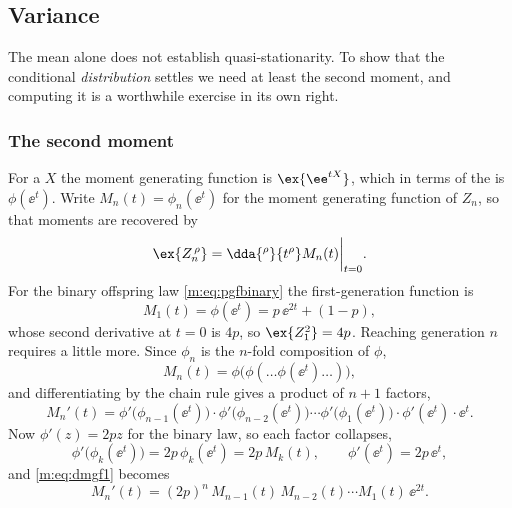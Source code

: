 \subsection{Variance}
\label{m:sec:variance}

The mean alone does not establish quasi-stationarity. To show that the conditional
\emph{distribution} settles we need at least the second moment, and computing it is
a worthwhile exercise in its own right.

\subsubsection{The second moment}

For a \rv{} $X$ the moment generating function is $\ex{\ee^{tX}}$, which in terms
of the \pgf{} is $\phi(\ee^t)$. Write $M_n(t) = \phi_n(\ee^t)$ for the moment
generating function of $Z_n$, so that moments are recovered by
\begin{equation}
\label{m:eq:mgfmoments}
\ex{Z_n^{\,\rho}} = \dda{^{\rho}}{t^{\rho}}M_n(t)\bigg|_{t=0} .
\end{equation}
For the binary offspring law \cref{m:eq:pgfbinary} the first-generation function is
\begin{equation}
\label{m:eq:mgf1}
M_1(t) = \phi(\ee^t) = p\,\ee^{2t} + (1-p),
\end{equation}
whose second derivative at $t=0$ is $4p$, so $\ex{Z_1^2}=4p$. Reaching generation
$n$ requires a little more. Since $\phi_n$ is the $n$-fold composition of $\phi$,
\begin{equation*}
M_n(t) = \phi\bigl(\phi(\dots\phi(\ee^t)\dots)\bigr),
\end{equation*}
and differentiating by the chain rule gives a product of $n+1$ factors,
\begin{equation}
\label{m:eq:dmgf1}
M_n'(t) = \phi'\bigl(\phi_{n-1}(\ee^t)\bigr)\cdot\phi'\bigl(\phi_{n-2}(\ee^t)\bigr)
\cdots\phi'\bigl(\phi_1(\ee^t)\bigr)\cdot\phi'(\ee^t)\cdot\ee^t .
\end{equation}
Now $\phi'(z) = 2pz$ for the binary law, so each factor collapses,
\begin{equation*}
\phi'\bigl(\phi_k(\ee^t)\bigr) = 2p\,\phi_k(\ee^t) = 2p\,M_k(t),
\qquad
\phi'(\ee^t) = 2p\,\ee^t ,
\end{equation*}
and \cref{m:eq:dmgf1} becomes
\begin{equation}
\label{m:eq:dmgf2}
M_n'(t) = (2p)^n\,M_{n-1}(t)\,M_{n-2}(t)\cdots M_1(t)\,\ee^{2t} .
\end{equation}
